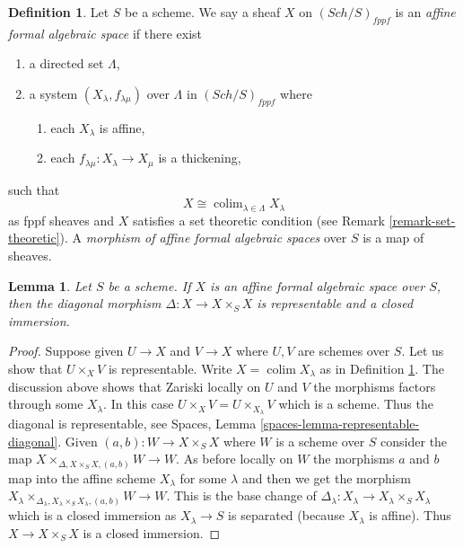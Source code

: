 \documentclass{stacks-project}
\theoremstyle{plain}
\newtheorem{lemma}[subsection]{Lemma}
\theoremstyle{definition}
\newtheorem{definition}[subsection]{Definition}
\theoremstyle{remark}
\numberwithin{equation}{subsection}
\def\colim{\mathop{\mathrm{colim}}\nolimits}
\def\Sch{\mathit{Sch}}
\begin{document}
\begin{definition}
\label{definition-affine-formal-algebraic-space}
Let $S$ be a scheme. We say a sheaf $X$ on $(\Sch/S)_{fppf}$ is an
{\it affine formal algebraic space} if there exist
\begin{enumerate}
\item a directed set $\Lambda$,
\item a system $(X_\lambda, f_{\lambda \mu})$ over $\Lambda$
in $(\Sch/S)_{fppf}$ where
\begin{enumerate}
\item each $X_\lambda$ is affine,
\item each $f_{\lambda \mu} : X_\lambda \to X_\mu$ is a thickening,
\end{enumerate}
\end{enumerate}
such that
$$
X \cong \colim_{\lambda \in \Lambda} X_\lambda
$$
as fppf sheaves and $X$ satisfies a set theoretic condition
(see Remark \ref{remark-set-theoretic}). A
{\it morphism of affine formal algebraic spaces}
over $S$ is a map of sheaves.
\end{definition}

\begin{lemma}
\label{lemma-diagonal-affine-formal-algebraic-space}
Let $S$ be a scheme. If $X$ is an affine formal algebraic space over
$S$, then the diagonal morphism $\Delta : X \to X \times_S X$
is representable and a closed immersion.
\end{lemma}

\begin{proof}
Suppose given $U \to X$ and $V \to X$ where $U, V$ are schemes over $S$.
Let us show that $U \times_X V$ is representable. Write $X = \colim X_\lambda$
as in Definition \ref{definition-affine-formal-algebraic-space}.
The discussion above shows that Zariski locally on $U$ and $V$ the morphisms
factors through some $X_\lambda$. In this case
$U \times_X V = U \times_{X_\lambda} V$ which is a scheme.
Thus the diagonal is representable, see
Spaces, Lemma \ref{spaces-lemma-representable-diagonal}.
Given $(a, b) : W \to X \times_S X$ where $W$ is a scheme over $S$
consider the map $X \times_{\Delta, X \times_S X, (a, b)} W \to W$.
As before locally on $W$ the morphisms $a$ and $b$ map into
the affine scheme $X_\lambda$ for some $\lambda$ and then
we get the morphism
$X_\lambda
\times_{\Delta_\lambda, X_\lambda \times_S X_\lambda, (a, b)} W \to W$.
This is the base change of
$\Delta_\lambda : X_\lambda \to X_\lambda \times_S X_\lambda$
which is a closed immersion as $X_\lambda \to S$ is separated
(because $X_\lambda$ is affine).
Thus $X \to X \times_S X$ is a closed immersion.
\end{proof}
\end{document}
